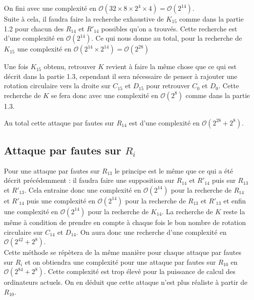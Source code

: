 \documentclass[10pt,a4paper]{article}
\begin{document}
On fini avec une complexité en $\mathcal{O}(32 \times 8 \times 2^{4} \times 4) = \mathcal{O}(2^{14})$.\\
Suite à cela, il faudra faire la recherche exhaustive de $K_{15}$ comme dans la partie 1.2 pour chacun des $R_{14}$ et $R'_{14}$ possibles qu'on a trouvés. Cette recherche est d'une complexité en $\mathcal{O}(2^{14})$. Ce qui nous donne au total, pour la recherche de $K_{15}$ une complexité en $\mathcal{O}(2^{14} \times 2^{14}) = \mathcal{O}(2^{28})$

Une fois $K_{15}$ obtenu, retrouver $K$ revient à faire la même chose que ce qui est décrit dans la partie 1.3, cependant il sera nécessaire de penser à rajouter une rotation circulaire vers la droite sur $C_{15}$ et $D_{15}$ pour retrouver $C_{0}$ et $D_{0}$. Cette recherche de $K$ se fera donc avec une complexité en $\mathcal{O}(2^{8})$ comme dans la partie 1.3.

Au total cette attaque par fautes sur $R_{14}$ est d'une complexité en $\mathcal{O}(2^{28} + 2^{8})$.

\subsection{Attaque par fautes sur $R_{i}$}
Pour une attaque par fautes sur $R_{13}$ le principe est le même que ce qui a été décrit précédemment : il faudra faire une supposition sur $R_{14}$ et $R'_{14}$ puis sur $R_{13}$ et $R'_{13}$. Cela entraine donc une complexité en $\mathcal{O}(2^{14})$ pour la recherche de $R_{14}$ et $R'_{14}$ puis une complexité en $\mathcal{O}(2^{14})$ pour la recherche de $R_{13}$ et $R'_{13}$ et enfin une complexité en $\mathcal{O}(2^{14})$ pour la recherche de $K_{14}$. La recherche de $K$ reste la même à condition de prendre en compte à chaque fois le bon nombre de rotation circulaire sur $C_{14}$ et $D_{14}$. On aura donc une recherche d'une complexité en $\mathcal{O}(2^{42} + 2^{8})$.\\
Cette méthode se répètera de la même manière pour chaque attaque par fautes sur $R_{i}$ et on obtiendra une complexité pour une attaque par fautes sur $R_{10}$ en $\mathcal{O}(2^{84} + 2^{8})$. Cette complexité est trop élevé pour la puissance de calcul des ordinateurs actuels. On en déduit que cette attaque n'est plus réaliste à partir de $R_{10}$.
\end{document}
